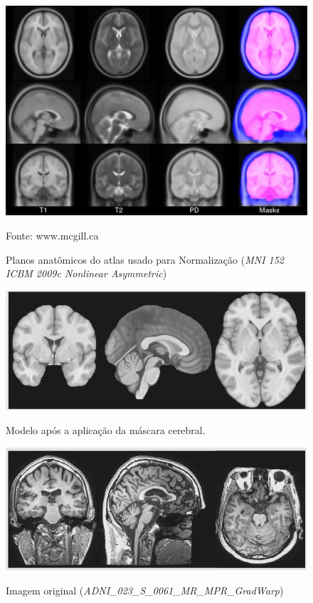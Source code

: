 \documentclass[openright]{UFRGS} %
\begin{document}
\begin{figure}[h]
    \centering
    \caption{Planos anatômicos do atlas usado para Normalização (\textit{MNI 152 ICBM 2009c
Nonlinear Asymmetric})}
    \includegraphics[scale=0.50]{mni_icbm152_lin.jpg}
    \centerline{Fonte: www.mcgill.ca}
    \label{fig:ICBMAtlas}
\end{figure}


\begin{figure}[h]
    \centering
    \caption{Modelo após a aplicação da máscara cerebral.}
    \includegraphics[scale=0.40]{depoisMask.png}
    \label{fig:depoisMask}
\end{figure}





\begin{figure}[h]
    \centering
    \caption{Imagem original (\textit{ADNI{\_}023{\_}S{\_}0061{\_}MR{\_}MPR{\_}GradWarp})}
    \includegraphics[scale=0.40]{MRIG3t1.png}
    \label{fig:MRIG3t1}
\end{figure}
\end{document}
